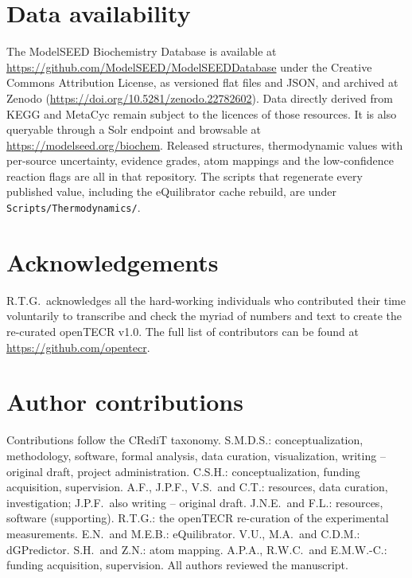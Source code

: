 \documentclass[unnumsec,webpdf,modern,large]{oup-authoring-template}
\newcommand{\modelseedurl}{\url{https://modelseed.org/biochem}}
\newcommand{\file}[1]{\texttt{#1}}                  %
\begin{document}
\section{Data availability}

The ModelSEED Biochemistry Database is available at \url{https://github.com/ModelSEED/ModelSEEDDatabase} under the Creative Commons Attribution License, as versioned flat files and JSON, and archived at Zenodo (\url{https://doi.org/10.5281/zenodo.22782602}). Data directly derived from KEGG and MetaCyc remain subject to the licences of those resources. It is also queryable through a Solr endpoint and browsable at \modelseedurl. Released structures, thermodynamic values with per-source uncertainty, evidence grades, atom mappings and the low-confidence reaction flags are all in that repository. The scripts that regenerate every published value, including the eQuilibrator cache rebuild, are under \file{Scripts/Thermodynamics/}.
\section{Acknowledgements} R.T.G.\ acknowledges all the hard-working individuals who contributed their time voluntarily to transcribe and check the myriad of numbers and text to create the re-curated openTECR v1.0. The full list of contributors can be found at \url{https://github.com/opentecr}.

\section{Author contributions} Contributions follow the CRediT taxonomy. S.M.D.S.: conceptualization, methodology, software, formal analysis, data curation, visualization, writing -- original draft, project administration. C.S.H.: conceptualization, funding acquisition, supervision. A.F., J.P.F., V.S.\ and C.T.: resources, data curation, investigation; J.P.F.\ also writing -- original draft. J.N.E.\ and F.L.: resources, software (supporting). R.T.G.: the openTECR re-curation of the experimental measurements. E.N.\ and M.E.B.: eQuilibrator. V.U., M.A.\ and C.D.M.: dGPredictor. S.H.\ and Z.N.: atom mapping. A.P.A., R.W.C.\ and E.M.W.-C.: funding acquisition, supervision. All authors reviewed the manuscript.
\end{document}

